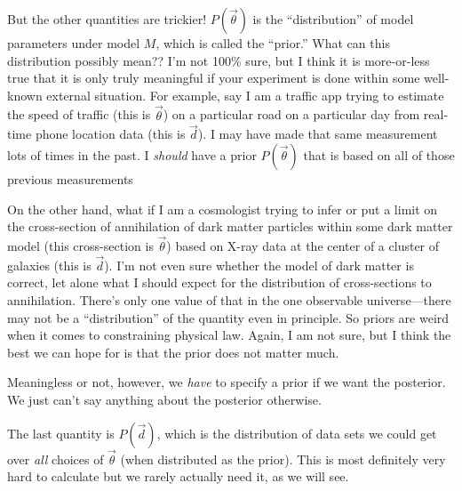 But the other quantities are trickier! $P(\vec{\theta})$ is the
``distribution'' of model parameters under model $M$, which is called
the ``prior.'' What can this distribution possibly mean?? I'm not
100\% sure, but I think it is more-or-less true that it is only truly
meaningful if your experiment is done within some well-known external
situation. For example, say I am a traffic app trying to estimate the
speed of traffic (this is $\vec{\theta}$) on a particular road on a
particular day from real-time phone location data (this is $\vec{d}$).
I may have made that same measurement lots of times in the past. I
{\it should} have a prior $P(\vec{\theta})$ that is based on all of
those previous measurements

On the other hand, what if I am a cosmologist trying to infer or put a
limit on the cross-section of annihilation of dark matter particles
within some dark matter model (this cross-section is $\vec{\theta}$)
based on X-ray data at the center of a cluster of galaxies (this is
$\vec{d}$). I'm not even sure whether the model of dark matter is
correct, let alone what I should expect for the distribution of
cross-sections to annihilation. There's only one value of that in the
one observable universe---there may not be a ``distribution'' of the
quantity even in principle. So priors are weird when it comes to
constraining physical law. Again, I am not sure, but I think the best
we can hope for is that the prior does not matter much.

Meaningless or not, however, we {\it have} to specify a prior if we
want the posterior. We just can't say anything about the posterior
otherwise.

The last quantity is $P(\vec{d})$, which is the distribution of data
sets we could get over {\it all} choices of $\vec{\theta}$ (when
distributed as the prior). This is most definitely very hard to
calculate but we rarely actually need it, as we will see.

